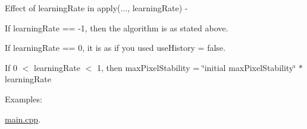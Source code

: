 Effect of learning\+Rate in apply(..., learning\+Rate) -\/
\begin{DoxyItemize}
\item If learning\+Rate == -\/1, then the algorithm is as stated above.
\item If learning\+Rate == 0, it is as if you used \textquotesingle{}use\+History = false\textquotesingle{}.
\item If 0 $<$ learning\+Rate $<$ 1, then max\+Pixel\+Stability = \char`\"{}initial max\+Pixel\+Stability\char`\"{} $\ast$ learning\+Rate 
\end{DoxyItemize}\begin{Desc}
\item[Examples\+: ]\par
\hyperlink{main_8cpp-example}{main.\+cpp}.\end{Desc}
